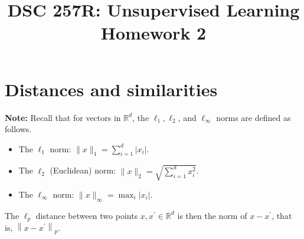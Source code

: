 \documentclass{article}
\title{DSC 257R: Unsupervised Learning \\ Homework 2}
\author{}
\date{}
\begin{document}
\maketitle

\section*{Distances and similarities}

\textbf{Note:} Recall that for vectors in $\mathbb{R}^{d}$, the $\ell_{1}, \ell_{2}$, and $\ell_{\infty}$ norms are defined as follows.

\begin{itemize}
\item The $\ell_{1}$ norm: $\|x\|_{1}=\sum_{i=1}^{d}\left|x_{i}\right|$.
\item The $\ell_{2}$ (Euclidean) norm: $\|x\|_{2}=\sqrt{\sum_{i=1}^{d} x_{i}^{2}}$.
\item The $\ell_{\infty}$ norm: $\|x\|_{\infty}=\max _{i}\left|x_{i}\right|$.
\end{itemize}

The $\ell_{p}$ distance between two points $x, x^{\prime} \in \mathbb{R}^{d}$ is then the norm of $x-x^{\prime}$, that is, $\left\|x-x^{\prime}\right\|_{p}$.
\end{document}
